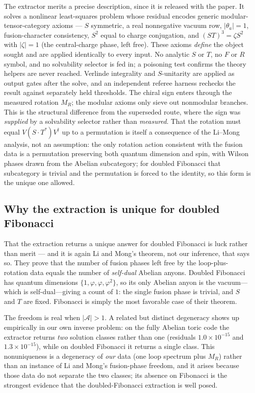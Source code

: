 \documentclass[aps,pra,twocolumn,superscriptaddress,longbibliography,floatfix,nofootinbib]{revtex4-2}
\begin{document}
The extractor merits a precise description, since it is released with the
paper. It solves a nonlinear least-squares problem whose residual encodes
generic modular-tensor-category axioms --- $S$ symmetric, a real nonnegative
vacuum row, $|\theta_a|=1$, fusion-character consistency, $S^{2}$ equal to
charge conjugation, and $(ST)^{3}=\zeta S^{2}$ with $|\zeta|=1$ (the
central-charge phase, left free). These axioms \emph{define} the object sought
and are applied identically to every input. No analytic $S$ or $T$, no $F$ or
$R$ symbol, and no solvability selector is fed in; a poisoning test confirms the
theory helpers are never reached. Verlinde integrality and $S$-unitarity are
applied as output gates after the solve, and an independent referee harness
rechecks the result against separately held thresholds. The chiral sign enters
through the measured rotation $M_R$; the modular axioms only sieve out
nonmodular branches. This is the structural difference from the superseded
route, where the sign was \emph{supplied} by a solvability selector rather than
\emph{measured}. That the rotation must equal $V(S\cdot T^{*})V^{\dagger}$ up to
a permutation is itself a consequence of the Li--Mong analysis, not an
assumption: the only rotation action consistent with the fusion data is a
permutation preserving both quantum dimension and spin, with Wilson phases
drawn from the Abelian subcategory; for doubled Fibonacci that subcategory is
trivial and the permutation is forced to the identity, so this form is the
unique one allowed.

\subsection{Why the extraction is unique for doubled Fibonacci}
\label{sec:unique}

That the extraction returns a unique answer for doubled Fibonacci is luck
rather than merit --- and it is again Li and Mong's theorem, not our inference,
that says so. They prove that the number of fusion phases left free by the
loop-plus-rotation data equals the number of \emph{self-dual} Abelian anyons.
Doubled Fibonacci has quantum dimensions $\{1,\varphi,\varphi,\varphi^{2}\}$, so
its only Abelian anyon is the vacuum---which is self-dual---giving a count of
$1$: the single fusion phase is trivial, and $S$ and $T$ are fixed. Fibonacci is simply the most favorable
case of their theorem.

The freedom is real when $|\mathcal{A}|>1$. A related but distinct degeneracy
shows up empirically in our own inverse problem: on the fully Abelian toric
code the extractor returns \emph{two} solution classes rather than one
(residuals $1.0\times10^{-15}$ and $1.3\times10^{-15}$), while on doubled
Fibonacci it returns a single class. This nonuniqueness is a degeneracy of
\emph{our} data (one loop spectrum plus $M_R$) rather than an instance of Li
and Mong's fusion-phase freedom, and it arises because those data do not
separate the two classes; its absence on Fibonacci is the strongest evidence
that the doubled-Fibonacci extraction is well posed.
\end{document}
